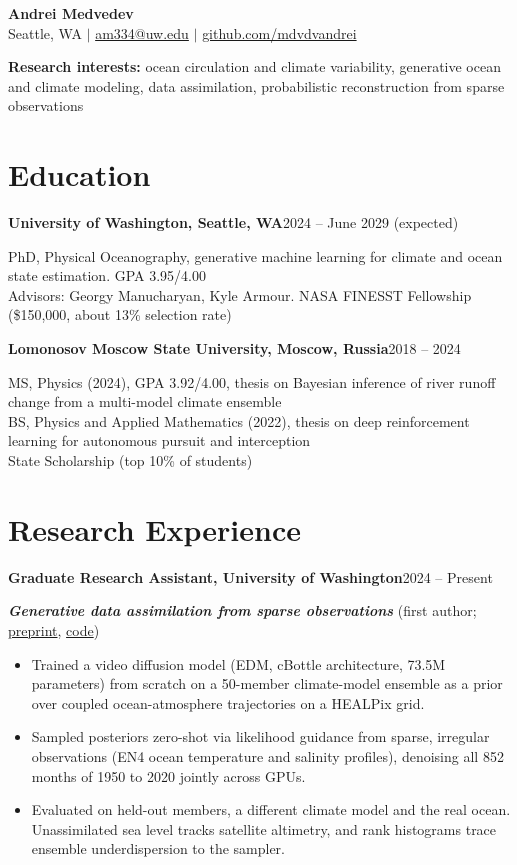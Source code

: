 \documentclass[letterpaper,10pt]{article}
\newcommand{\entry}[2]{%
  \noindent\textbf{#1}\hfill #2\par\nopagebreak\vspace{-0.5pt}
}
\newcommand{\proj}[1]{\vspace{1.5pt}\textbf{\textit{#1}}}
\begin{document}
\begin{center}
    {\LARGE\textbf{Andrei Medvedev}}\\[3pt]
    Seattle, WA
    \quad $|$ \quad
    \href{mailto:am334@uw.edu}{am334@uw.edu}
    \quad $|$ \quad
    \href{https://github.com/mdvdvandrei}{github.com/mdvdvandrei}
\end{center}
\vspace{-6pt}

\textbf{Research interests:} ocean circulation and climate variability, generative ocean and climate modeling, data assimilation, probabilistic reconstruction from sparse observations

\section{Education}

\entry{University of Washington, Seattle, WA}{2024 -- June 2029 (expected)}
PhD, Physical Oceanography, generative machine learning for climate and ocean state estimation. GPA 3.95/4.00\\
Advisors: Georgy Manucharyan, Kyle Armour. NASA FINESST Fellowship (\$150,000, about 13\% selection rate)

\entry{Lomonosov Moscow State University, Moscow, Russia}{2018 -- 2024}
MS, Physics (2024), GPA 3.92/4.00, thesis on Bayesian inference of river runoff change from a multi-model climate ensemble\\
BS, Physics and Applied Mathematics (2022), thesis on deep reinforcement learning for autonomous pursuit and interception\\
State Scholarship (top 10\% of students)

\section{Research Experience}

\entry{Graduate Research Assistant, University of Washington}{2024 -- Present}

\proj{Generative data assimilation from sparse observations} (first author; \href{https://doi.org/10.22541/essoar.15011822/v1}{preprint}, \href{https://github.com/mdvdvandrei/GenDA-historical-3d-ocean-reconstruction}{code})
\begin{itemize}
    \item Trained a video diffusion model (EDM, cBottle architecture, 73.5M parameters) from scratch on a 50-member climate-model ensemble as a prior over coupled ocean-atmosphere trajectories on a HEALPix grid.
    \item Sampled posteriors zero-shot via likelihood guidance from sparse, irregular observations (EN4 ocean temperature and salinity profiles), denoising all 852 months of 1950 to 2020 jointly across GPUs.
    \item Evaluated on held-out members, a different climate model and the real ocean. Unassimilated sea level tracks satellite altimetry, and rank histograms trace ensemble underdispersion to the sampler.
\end{itemize}
\end{document}
